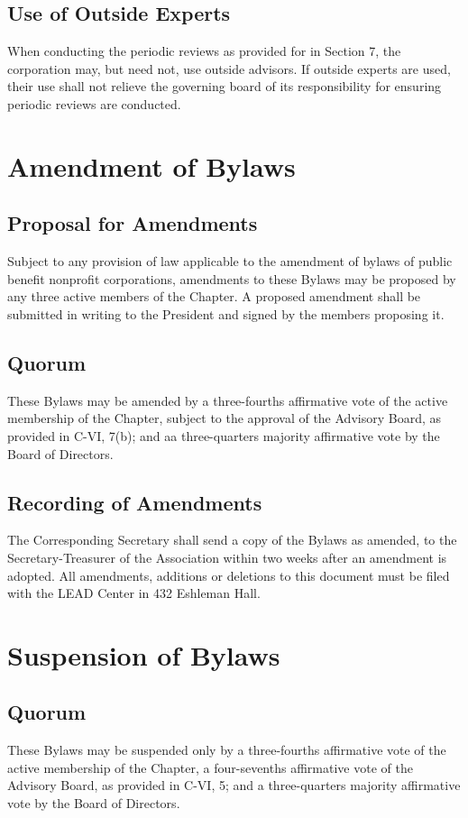 \documentclass{article}
\begin{document}
	\subsection{Use of Outside Experts}
	When conducting the periodic reviews as provided for in Section 7, the corporation may, but need not, use outside advisors. If outside experts are used, their use shall not relieve the governing board of its responsibility for ensuring periodic reviews are conducted.
	
	\section{Amendment of Bylaws}
	\subsection{Proposal for Amendments}
	Subject to any provision of law applicable to the amendment of bylaws of public benefit nonprofit corporations, amendments to these Bylaws may be proposed by any three active members of the Chapter. A proposed amendment shall be submitted in writing to the President and signed by the members proposing it.
	\subsection{Quorum}
	These Bylaws may be amended by a three-fourths affirmative vote of the active membership of the Chapter, subject to the approval of the Advisory Board, as provided in C-VI, 7(b); and aa three-quarters majority affirmative vote by the Board of Directors.
	\subsection{Recording of Amendments}
	The Corresponding Secretary shall send a copy of the Bylaws as amended, to the Secretary-Treasurer of the Association within two weeks after an amendment is adopted. All amendments, additions or deletions to this document must be filed with the LEAD Center in 432 Eshleman Hall.
	
	\section{Suspension of Bylaws}
	\subsection{Quorum}
	These Bylaws may be suspended only by a three-fourths affirmative vote of the active membership of the Chapter, a four-sevenths affirmative vote of the Advisory Board, as provided in C-VI, 5; and a three-quarters majority affirmative vote by the Board of Directors.
	
\end{document}
